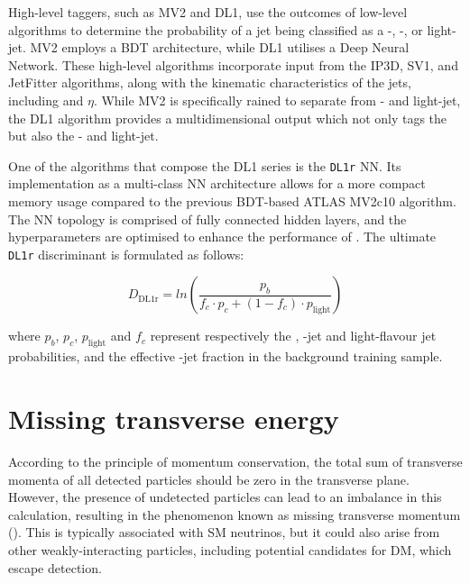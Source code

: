 High-level taggers, such as MV2 and DL1\cite{ATLAS:2017bcq}, use the outcomes 
of low-level algorithms to determine the probability of a jet being classified as a 
\Pbottom-, \Pcharm-, or light-jet. MV2 employs a BDT architecture, while DL1 utilises 
a Deep Neural Network. These high-level algorithms incorporate input from the IP3D, 
SV1, and JetFitter algorithms, along with the kinematic characteristics of the jets, 
including \pT and $\eta$. While MV2 is specifically rained to separate \bjets from
\Pcharm- and light-jet, the DL1 algorithm  provides a multidimensional output which
not only tags the \bjets but also the \Pcharm- and light-jet. 

One of the algorithms that compose the DL1 series is the \texttt{DL1r} NN.
Its implementation as a multi-class NN architecture allows for a more compact 
memory usage compared to the previous BDT-based ATLAS MV2c10 
algorithm\cite{ATLAS:2019bwq}. The NN topology is comprised of fully connected 
hidden layers, and the hyperparameters are optimised to enhance the performance 
of \btag. The ultimate \texttt{DL1r} \btag discriminant is formulated as follows:

\begin{equation}
\label{eq:Chap3:DL1r_discriminant}
	D_{\text{DL1r}}=ln \left(\frac{p_{b}}{f_{c} \cdot p_{c}+( 1 - f_{c})\cdot p_{ \text{light} }} \right)
\end{equation}

where $p_{b}$, $p_{c}$, $p_{\text{light}}$ and $f_{c}$ represent respectively the \bjet,
\Pcharm-jet and light-flavour jet probabilities, and
the effective \Pcharm-jet fraction in the background training sample\cite{ATLAS:2022qxm}. 

\section{Missing transverse energy}
According to the principle of momentum conservation, the total sum of transverse 
momenta of all detected particles should be zero in the transverse plane. However, 
the presence of undetected particles can lead to an imbalance in this calculation, 
resulting in the phenomenon known as missing transverse momentum (\MET). 
This \MET is typically associated with SM neutrinos, but it could also arise from 
other weakly-interacting particles, including potential candidates for DM, which escape detection.

